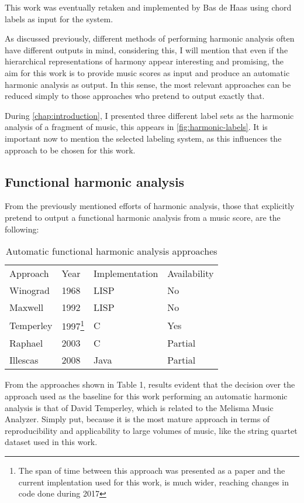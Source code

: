     This work was eventually retaken and implemented by Bas de Haas \cite{de2013automatic} using chord labels as input for the system.

    As discussed previously, different methods of performing harmonic analysis often have different outputs in mind, considering this, I will mention that even if the hierarchical representations of harmony appear interesting and promising, the aim for this work is to provide music scores as input and produce an automatic harmonic analysis as output. In this sense, the most relevant approaches can be reduced simply to those approaches who pretend to output exactly that.

  During \autoref{chap:introduction}, I presented three different label sets as the harmonic analysis of a fragment of music, this appears in \autoref{fig:harmonic-labels}. It is important now to mention the selected labeling system, as this influences the approach to be chosen for this work.

  \subsection{Functional harmonic analysis}
  From the previously mentioned efforts of harmonic analysis, those that explicitly pretend to output a functional harmonic analysis from a music score, are the following:
  \begin{table}[tbp]
    \centering
    \caption{Automatic functional harmonic analysis approaches}
    \label{my-label}
    \begin{tabular}{llll}
      Approach & Year & Implementation & Availability \\
      Winograd & 1968 & LISP & No \\
      Maxwell & 1992 & LISP & No \\
      Temperley & 1997\footnote{The span of time between this approach was presented as a paper and the current implentation used for this work, is much wider, reaching changes in code done during 2017} & C & Yes \\
      Raphael & 2003 & C & Partial \\
      Illescas & 2008 & Java & Partial
    \end{tabular}
  \end{table}
  From the approaches shown in Table 1, results evident that the decision over the approach used as the baseline for this work performing an automatic harmonic analysis is that of David Temperley, which is related to the Melisma Music Analyzer. Simply put, because it is the most mature approach in terms of reproducibility and applicability to large volumes of music, like the string quartet dataset used in this work.

